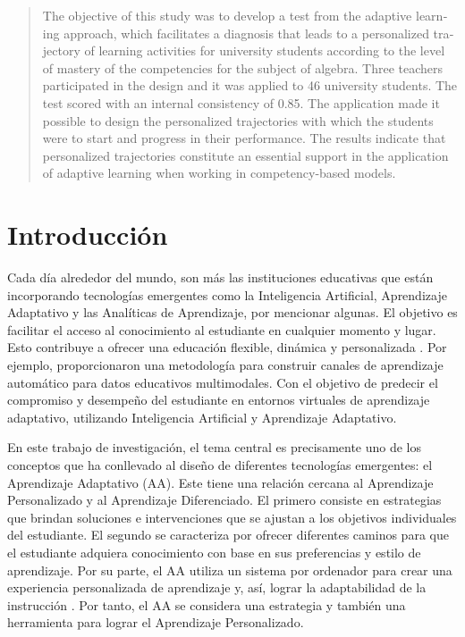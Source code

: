 \documentclass[spanish]{textolivre}
\begin{document}
\begin{polyabstract}
\begin{english}
\begin{abstract}
The objective of this study was to develop a test from the adaptive learning approach, which facilitates a diagnosis that leads to a personalized trajectory of learning activities for university students according to the level of mastery of the competencies for the subject of algebra. Three teachers participated in the design and it was applied to 46 university students. The test scored with an internal consistency of 0.85. The application made it  possible to design the personalized trajectories with which the students were to start and progress in their performance. The results indicate that personalized trajectories constitute an essential support in the application of adaptive learning when working in competency-based models.

\end{abstract}
\end{english}
\end{polyabstract}

\section{Introducción}\label{sec-intro}
Cada día alrededor del mundo, son más las instituciones educativas que están incorporando tecnologías emergentes como la Inteligencia Artificial, Aprendizaje Adaptativo y las Analíticas de Aprendizaje, por mencionar algunas. El objetivo es facilitar el acceso al conocimiento al estudiante en cualquier momento y lugar. Esto contribuye a ofrecer una educación flexible, dinámica y personalizada \cite{dziuban2016}. Por ejemplo, \textcite{sharma2019} proporcionaron una metodología para construir canales de aprendizaje automático para datos educativos multimodales. Con el objetivo de predecir el compromiso y desempeño del estudiante en entornos virtuales de aprendizaje adaptativo, utilizando Inteligencia Artificial y Aprendizaje Adaptativo. 

En este trabajo de investigación, el tema central es precisamente uno de los conceptos que ha conllevado al diseño de diferentes tecnologías emergentes: el Aprendizaje Adaptativo (AA). Este tiene una relación cercana al Aprendizaje Personalizado y al Aprendizaje Diferenciado. El primero consiste en estrategias que brindan soluciones e intervenciones que se ajustan a los objetivos individuales del estudiante. El segundo se caracteriza por ofrecer diferentes caminos para que el estudiante adquiera conocimiento con base en sus preferencias y estilo de aprendizaje. Por su parte, el AA utiliza un sistema por ordenador para crear una experiencia personalizada de aprendizaje y, así, lograr la adaptabilidad de la instrucción \cite{morillo2016}. %
Por tanto, el AA se considera una estrategia y también una herramienta para lograr el Aprendizaje Personalizado. 
\end{document}
